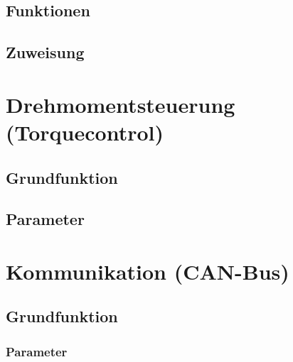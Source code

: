\subsection{Funktionen}
\subsection{Zuweisung}


\section{Drehmomentsteuerung (Torquecontrol)}
\subsection{Grundfunktion}
\subsection{Parameter}


\section{Kommunikation (CAN-Bus)}
\subsection{Grundfunktion}
\subsubsection{Parameter}
